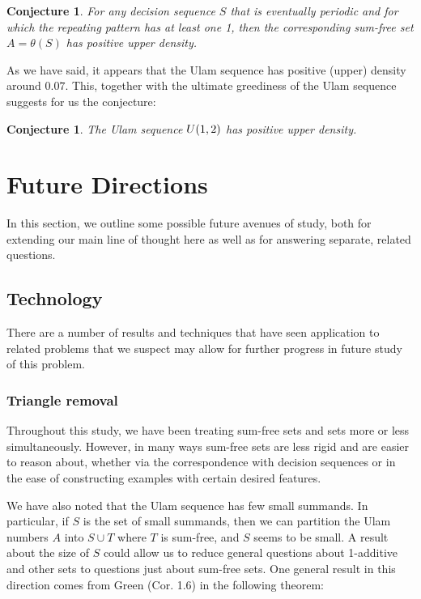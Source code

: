 \documentclass{report}
\newtheorem{conjecture}[theorem]{Conjecture}
\theoremstyle{remark}
\numberwithin{equation}{section}
\begin{document}
\begin{conjecture}
  For any decision sequence $S$ that is eventually periodic and for
  which the repeating pattern has at least one 1, then the
  corresponding sum-free set $A = \theta(S)$ has positive upper
  density.
\end{conjecture}

As we have said, it appears that the Ulam sequence has positive
(upper) density around $0.07$.  This, together with the ultimate
greediness of the Ulam sequence suggests for us the conjecture:

\begin{conjecture}
  The Ulam sequence $U(1,2)$ has positive upper density.
\end{conjecture}

\chapter{Future Directions}

In this section, we outline some possible future avenues of study,
both for extending our main line of thought here as well as for
answering separate, related questions.  

\section{Technology}

There are a number of results and techniques that have seen
application to related problems that we suspect may allow for further
progress in future study of this problem.  

\subsection{Triangle removal}

Throughout this study, we have been treating sum-free sets and
\relevant sets more or less simultaneously.  However, in many ways
sum-free sets are less rigid and are easier to reason about, whether
via the correspondence with decision sequences or in the ease of
constructing examples with certain desired features.  

We have also noted that the Ulam sequence has few small summands.  In
particular, if $S$ is the set of small summands, then we can partition
the Ulam numbers $A$ into $S \cup T$ where $T$ is sum-free, and $S$
seems to be small.  A result about the size of $S$ could allow us to
reduce general questions about 1-additive and other \relevant sets to
questions just about sum-free sets.  One general result in this
direction comes from Green \cite{green:gfa2005} (Cor. 1.6) in the
following theorem:
\end{document}
